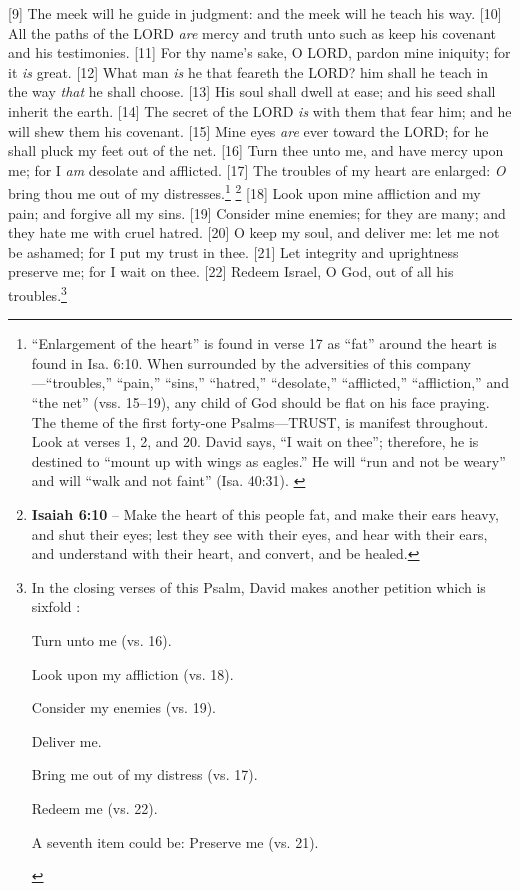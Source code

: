 [9] \textcolor[cmyk]{0.99998,1,0,0}{The meek will he guide in judgment: and the meek will he teach his way.}
[10] \textcolor[cmyk]{0.99998,1,0,0}{All the paths of the LORD \emph{are} mercy and truth unto such as keep his covenant and his testimonies.}
[11] \textcolor[cmyk]{0.99998,1,0,0}{For thy name's sake, O LORD, pardon mine iniquity; for it \emph{is} great.}
[12] \textcolor[cmyk]{0.99998,1,0,0}{What man \emph{is} he that feareth the LORD? him shall he teach in the way \emph{that} he shall choose.}
[13] \textcolor[cmyk]{0.99998,1,0,0}{His soul shall dwell at ease; and his seed shall inherit the earth.}
[14] \textcolor[cmyk]{0.99998,1,0,0}{The secret of the LORD \emph{is} with them that fear him; and he will shew them his covenant.}
[15] \textcolor[cmyk]{0.99998,1,0,0}{Mine eyes \emph{are} ever toward the LORD; for he shall pluck my feet out of the net.}
[16] \textcolor[cmyk]{0.99998,1,0,0}{Turn thee unto me, and have mercy upon me; for I \emph{am} desolate and afflicted.}
[17] \textcolor[cmyk]{0.99998,1,0,0}{The troubles of my heart are enlarged: \emph{O} bring thou me out of my distresses.}\footnote{“Enlargement of the heart” is found in verse 17 as “fat” around the heart is found in Isa. 6:10. When surrounded by the adversities of this company—“troubles,” “pain,” “sins,” “hatred,” “desolate,” “afflicted,” “affliction,” and “the net” (vss. 15–19), any child of God should be flat on his face praying. The theme of the first forty-one Psalms—TRUST, is manifest throughout. Look at verses 1, 2, and 20. David says, “I wait on thee”; therefore, he is destined to “mount up with wings as eagles.” He will “run and not be weary” and will “walk and not faint” (Isa. 40:31). \cite{Ruckman1992Psalms}} \footnote{\textbf{Isaiah 6:10} -- Make the heart of this people fat, and make their ears heavy, and shut their eyes; lest they see with their eyes, and hear with their ears, and understand with their heart, and convert, and be healed.}
[18] \textcolor[cmyk]{0.99998,1,0,0}{Look upon mine affliction and my pain; and forgive all my sins.}
[19] \textcolor[cmyk]{0.99998,1,0,0}{Consider mine enemies; for they are many; and they hate me with cruel hatred.}
[20] \textcolor[cmyk]{0.99998,1,0,0}{O keep my soul, and deliver me: let me not be ashamed; for I put my trust in thee.}
[21] \textcolor[cmyk]{0.99998,1,0,0}{Let integrity and uprightness preserve me; for I wait on thee.}
[22] \textcolor[cmyk]{0.99998,1,0,0}{Redeem Israel, O God, out of all his troubles.}\footnote{In the closing verses of this Psalm, David makes another petition which is sixfold \cite{Ruckman1992Psalms}:
\begin{compactenum}
\item Turn unto me (vs. 16).
\item Look upon my affliction (vs. 18).
\item Consider my enemies (vs. 19).
\item Deliver me.
\item Bring me out of my distress (vs. 17).
\item Redeem me (vs. 22).
\item A seventh item could be: Preserve me (vs. 21).
\end{compactenum}}


